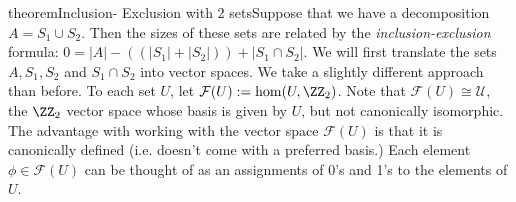 \begin{doubledpage}{theorem}{Inclusion- Exclusion with 2 sets}{Suppose that we have a decomposition $A=S_1\cup S_2$. Then the sizes of these sets are related by the \emph{inclusion-exclusion} formula: $0=|A| -(\left(|S_1|+|S_2|\right))+|S_1\cap S_2|.$}
We will first translate the sets $A, S_1, S_2$ and $S_1\cap S_2$ into vector spaces. 
We take a slightly different approach than before. 
To each set $U$, let $\mathcal F(U):= \hom(U, \ZZ_2)$. Note that $\mathcal F(U)\cong \mathcal U$, the $\ZZ_2$ vector space whose basis is given by $U$, but not canonically isomorphic. The advantage with working with the vector space $\mathcal F(U)$ is that it is canonically defined (i.e. doesn't come with a preferred basis.)
Each element $\phi\in \mathcal F(U)$ can be thought of as an assignments of 0's and 1's to the elements of $U$. 


\end{doubledpage}
